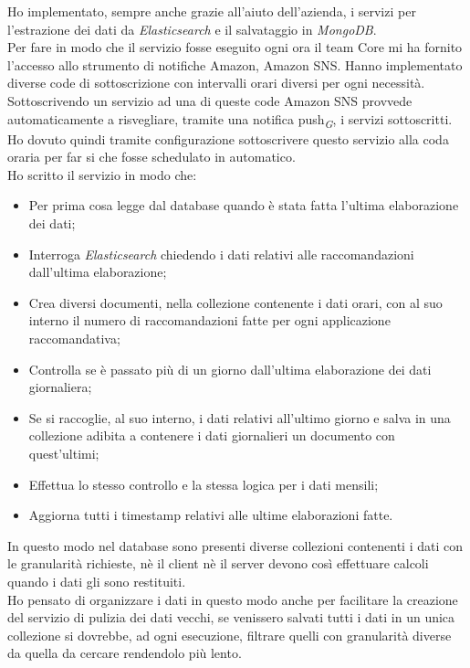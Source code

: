 \documentclass[a4paper, 12pt, twoside, openright]{book}
\newcommand{\gloss}[1]{#1\textsubscript{\textit{\tiny{G}}}}
\begin{document}
Ho implementato, sempre anche grazie all'aiuto dell'azienda, i servizi per l'estrazione dei dati da \textit{Elasticsearch} e il salvataggio in \textit{MongoDB}.\\
Per fare in modo che il servizio fosse eseguito ogni ora il team Core mi ha fornito l'accesso allo strumento di notifiche Amazon, Amazon SNS. Hanno implementato diverse code di sottoscrizione con intervalli orari diversi per ogni necessità. Sottoscrivendo un servizio ad una di queste code Amazon SNS provvede automaticamente a risvegliare, tramite una \gloss{notifica push}, i servizi sottoscritti.\\
Ho dovuto quindi tramite configurazione sottoscrivere questo servizio alla coda oraria per far si che fosse schedulato in automatico.\\
Ho scritto il servizio in modo che:
\begin{itemize}
	\item Per prima cosa legge dal database quando è stata fatta l'ultima elaborazione dei dati;
	\item Interroga \textit{Elasticsearch} chiedendo i dati relativi alle raccomandazioni dall'ultima elaborazione;
	\item Crea diversi documenti, nella collezione contenente i dati orari, con al suo interno il numero di raccomandazioni fatte per ogni applicazione raccomandativa;
	\item Controlla se è passato più di un giorno dall'ultima elaborazione dei dati giornaliera;
	\item Se si raccoglie, al suo interno, i dati relativi all'ultimo giorno e salva in una collezione adibita a contenere i dati giornalieri un documento con quest'ultimi;
	\item Effettua lo stesso controllo e la stessa logica per i dati mensili;
	\item Aggiorna tutti i timestamp relativi alle ultime elaborazioni fatte.
\end{itemize}
In questo modo nel database sono presenti diverse collezioni contenenti i dati con le granularità richieste, nè il client nè il server devono così effettuare calcoli quando i dati gli sono restituiti.\\
Ho pensato di organizzare i dati in questo modo anche per facilitare la creazione del servizio di pulizia dei dati vecchi, se venissero salvati tutti i dati in un unica collezione si dovrebbe, ad ogni esecuzione, filtrare quelli con granularità diverse da quella da cercare rendendolo più lento.\\
\end{document}
